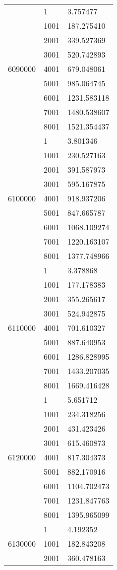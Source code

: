 \begin{table}[htb!]
\begin{tabular}{lll}
\multirow[c]{9}{*}{6090000} & 1 & 3.757477 \\
 & 1001 & 187.275410 \\
 & 2001 & 339.527369 \\
 & 3001 & 520.742893 \\
 & 4001 & 679.048061 \\
 & 5001 & 985.064745 \\
 & 6001 & 1231.583118 \\
 & 7001 & 1480.538607 \\
 & 8001 & 1521.354437 \\
\multirow[c]{9}{*}{6100000} & 1 & 3.801346 \\
 & 1001 & 230.527163 \\
 & 2001 & 391.587973 \\
 & 3001 & 595.167875 \\
 & 4001 & 918.937206 \\
 & 5001 & 847.665787 \\
 & 6001 & 1068.109274 \\
 & 7001 & 1220.163107 \\
 & 8001 & 1377.748966 \\
\multirow[c]{9}{*}{6110000} & 1 & 3.378868 \\
 & 1001 & 177.178383 \\
 & 2001 & 355.265617 \\
 & 3001 & 524.942875 \\
 & 4001 & 701.610327 \\
 & 5001 & 887.640953 \\
 & 6001 & 1286.828995 \\
 & 7001 & 1433.207035 \\
 & 8001 & 1669.416428 \\
\multirow[c]{9}{*}{6120000} & 1 & 5.651712 \\
 & 1001 & 234.318256 \\
 & 2001 & 431.423426 \\
 & 3001 & 615.460873 \\
 & 4001 & 817.304373 \\
 & 5001 & 882.170916 \\
 & 6001 & 1104.702473 \\
 & 7001 & 1231.847763 \\
 & 8001 & 1395.965099 \\
\multirow[c]{9}{*}{6130000} & 1 & 4.192352 \\
 & 1001 & 182.843208 \\
 & 2001 & 360.478163 \\

\end{tabular}
\end{table}
